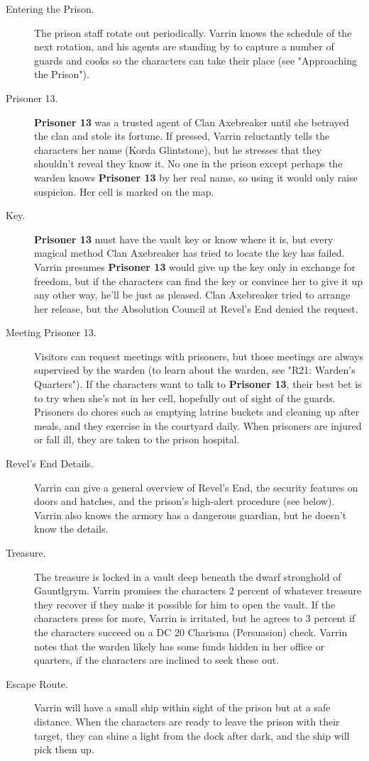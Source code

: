 \documentclass[10pt,a4paper,twoside,bg=print,twocolumn,openany,nodeprecatedcode]{dndbook}
\begin{document}
\begin{description}
\item[Entering the Prison.]
The prison staff rotate out periodically. Varrin knows the schedule of the next rotation, and his agents are standing by to capture a number of guards and cooks so the characters can take their place (see "Approaching the Prison").
\item[Prisoner 13.]
\textbf{Prisoner 13} was a trusted agent of Clan Axebreaker until she betrayed the clan and stole its fortune. If pressed, Varrin reluctantly tells the characters her name (Korda Glintstone), but he stresses that they shouldn't reveal they know it. No one in the prison except perhaps the warden knows \textbf{Prisoner 13} by her real name, so using it would only raise suspicion. Her cell is marked on the map.
\item[Key.]
\textbf{Prisoner 13} must have the vault key or know where it is, but every magical method Clan Axebreaker has tried to locate the key has failed. Varrin presumes \textbf{Prisoner 13} would give up the key only in exchange for freedom, but if the characters can find the key or convince her to give it up any other way, he'll be just as pleased. Clan Axebreaker tried to arrange her release, but the Absolution Council at Revel's End denied the request.
\item[Meeting Prisoner 13.]
Visitors can request meetings with prisoners, but those meetings are always supervised by the warden (to learn about the warden, see "R21: Warden's Quarters"). If the characters want to talk to \textbf{Prisoner 13}, their best bet is to try when she's not in her cell, hopefully out of sight of the guards. Prisoners do chores such as emptying latrine buckets and cleaning up after meals, and they exercise in the courtyard daily. When prisoners are injured or fall ill, they are taken to the prison hospital.
\item[Revel's End Details.]
Varrin can give a general overview of Revel's End, the security features on doors and hatches, and the prison's high-alert procedure (see below). Varrin also knows the armory has a dangerous guardian, but he doesn't know the details.
\item[Treasure.]
The treasure is locked in a vault deep beneath the dwarf stronghold of Gauntlgrym. Varrin promises the characters 2 percent of whatever treasure they recover if they make it possible for him to open the vault. If the characters press for more, Varrin is irritated, but he agrees to 3 percent if the characters succeed on a DC 20 Charisma (Persuasion) check. Varrin notes that the warden likely has some funds hidden in her office or quarters, if the characters are inclined to seek these out.
\item[Escape Route.]
Varrin will have a small ship within sight of the prison but at a safe distance. When the characters are ready to leave the prison with their target, they can shine a light from the dock after dark, and the ship will pick them up.
\end{description}
\end{document}
